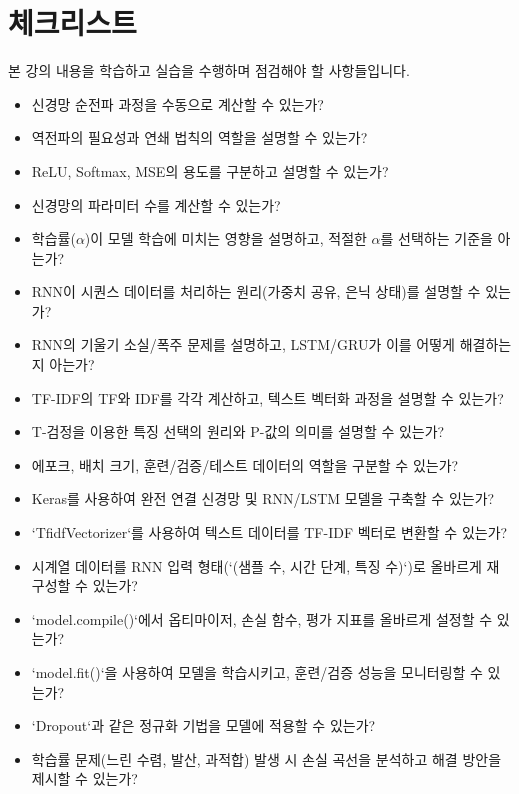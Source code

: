 \documentclass[11pt,a4paper]{article}
\begin{document}
\newpage
\section{체크리스트}
본 강의 내용을 학습하고 실습을 수행하며 점검해야 할 사항들입니다.

\begin{tcolorbox}[title=\textbf{학습 및 이해도 점검}]
\begin{itemize}
    \item 신경망 순전파 과정을 수동으로 계산할 수 있는가?
    \item 역전파의 필요성과 연쇄 법칙의 역할을 설명할 수 있는가?
    \item ReLU, Softmax, MSE의 용도를 구분하고 설명할 수 있는가?
    \item 신경망의 파라미터 수를 계산할 수 있는가?
    \item 학습률($\alpha$)이 모델 학습에 미치는 영향을 설명하고, 적절한 $\alpha$를 선택하는 기준을 아는가?
    \item RNN이 시퀀스 데이터를 처리하는 원리(가중치 공유, 은닉 상태)를 설명할 수 있는가?
    \item RNN의 기울기 소실/폭주 문제를 설명하고, LSTM/GRU가 이를 어떻게 해결하는지 아는가?
    \item TF-IDF의 TF와 IDF를 각각 계산하고, 텍스트 벡터화 과정을 설명할 수 있는가?
    \item T-검정을 이용한 특징 선택의 원리와 P-값의 의미를 설명할 수 있는가?
    \item 에포크, 배치 크기, 훈련/검증/테스트 데이터의 역할을 구분할 수 있는가?
\end{itemize}
\end{tcolorbox}

\begin{tcolorbox}[title=\textbf{실습 및 코드 구현 점검}]
\begin{itemize}
    \item Keras를 사용하여 완전 연결 신경망 및 RNN/LSTM 모델을 구축할 수 있는가?
    \item `TfidfVectorizer`를 사용하여 텍스트 데이터를 TF-IDF 벡터로 변환할 수 있는가?
    \item 시계열 데이터를 RNN 입력 형태(`(샘플 수, 시간 단계, 특징 수)`)로 올바르게 재구성할 수 있는가?
    \item `model.compile()`에서 옵티마이저, 손실 함수, 평가 지표를 올바르게 설정할 수 있는가?
    \item `model.fit()`을 사용하여 모델을 학습시키고, 훈련/검증 성능을 모니터링할 수 있는가?
    \item `Dropout`과 같은 정규화 기법을 모델에 적용할 수 있는가?
    \item 학습률 문제(느린 수렴, 발산, 과적합) 발생 시 손실 곡선을 분석하고 해결 방안을 제시할 수 있는가?
\end{itemize}
\end{tcolorbox}
\end{document}
